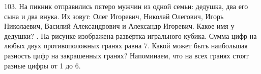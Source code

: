 103. На пикник отправились пятеро мужчин из одной семьи: дедушка, два его сына и два внука. Их зовут: Олег Игоревич, Николай Олегович, Игорь Николаевич, Василий Александрович и Александр Игоревич. Какое имя у дедушки?\newpage
{}. На рисунке изображена развёртка игрального кубика. Сумма цифр на любых двух противоположных гранях равна 7. Какой может быть наибольшая разность цифр на закрашенных гранях? Напоминаем, что на всех гранях стоят разные цифры от 1 до 6.
\begin{center}
\begin{figure}[ht!]
\end{figure}
\end{center}
